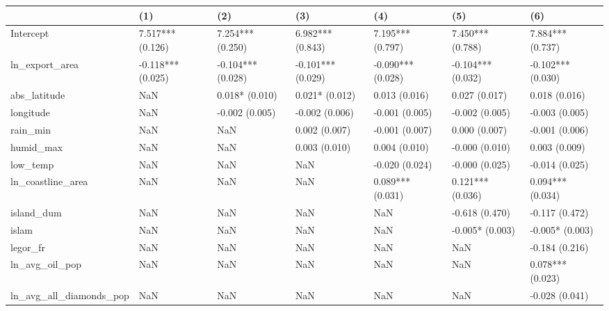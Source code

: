 \begin{tabular}{lllllll}
\toprule
 & (1) & (2) & (3) & (4) & (5) & (6) \\
\midrule
Intercept & 7.517***
(0.126) & 7.254***
(0.250) & 6.982***
(0.843) & 7.195***
(0.797) & 7.450***
(0.788) & 7.884***
(0.737) \\
ln_export_area & -0.118***
(0.025) & -0.104***
(0.028) & -0.101***
(0.029) & -0.090***
(0.028) & -0.104***
(0.032) & -0.102***
(0.030) \\
abs_latitude & NaN & 0.018*
(0.010) & 0.021*
(0.012) & 0.013
(0.016) & 0.027
(0.017) & 0.018
(0.016) \\
longitude & NaN & -0.002
(0.005) & -0.002
(0.006) & -0.001
(0.005) & -0.002
(0.005) & -0.003
(0.005) \\
rain_min & NaN & NaN & 0.002
(0.007) & -0.001
(0.007) & 0.000
(0.007) & -0.001
(0.006) \\
humid_max & NaN & NaN & 0.003
(0.010) & 0.004
(0.010) & -0.000
(0.010) & 0.003
(0.009) \\
low_temp & NaN & NaN & NaN & -0.020
(0.024) & -0.000
(0.025) & -0.014
(0.025) \\
ln_coastline_area & NaN & NaN & NaN & 0.089***
(0.031) & 0.121***
(0.036) & 0.094***
(0.034) \\
island_dum & NaN & NaN & NaN & NaN & -0.618
(0.470) & -0.117
(0.472) \\
islam & NaN & NaN & NaN & NaN & -0.005*
(0.003) & -0.005*
(0.003) \\
legor_fr & NaN & NaN & NaN & NaN & NaN & -0.184
(0.216) \\
ln_avg_oil_pop & NaN & NaN & NaN & NaN & NaN & 0.078***
(0.023) \\
ln_avg_all_diamonds_pop & NaN & NaN & NaN & NaN & NaN & -0.028
(0.041) \\
\bottomrule
\end{tabular}
